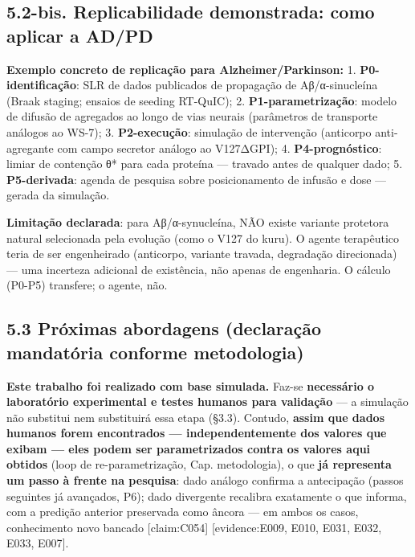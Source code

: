 \documentclass[
  12pt,
]{report}
\begin{document}
\hypertarget{bis.-replicabilidade-demonstrada-como-aplicar-a-adpd}{%
\subsection{5.2-bis. Replicabilidade demonstrada: como aplicar a
AD/PD}\label{bis.-replicabilidade-demonstrada-como-aplicar-a-adpd}}

\textbf{Exemplo concreto de replicação para Alzheimer/Parkinson:} 1.
\textbf{P0-identificação}: SLR de dados publicados de propagação de
Aβ/α-sinucleína (Braak staging; ensaios de seeding RT-QuIC); 2.
\textbf{P1-parametrização}: modelo de difusão de agregados ao longo de
vias neurais (parâmetros de transporte análogos ao WS-7); 3.
\textbf{P2-execução}: simulação de intervenção (anticorpo anti-agregante
com campo secretor análogo ao V127ΔGPI); 4. \textbf{P4-prognóstico}:
limiar de contenção θ* para cada proteína --- travado antes de qualquer
dado; 5. \textbf{P5-derivada}: agenda de pesquisa sobre posicionamento
de infusão e dose --- gerada da simulação.

\textbf{Limitação declarada}: para Aβ/α-synucleína, NÃO existe variante
protetora natural selecionada pela evolução (como o V127 do kuru). O
agente terapêutico teria de ser engenheirado (anticorpo, variante
travada, degradação direcionada) --- uma incerteza adicional de
existência, não apenas de engenharia. O cálculo (P0-P5) transfere; o
agente, não.

\hypertarget{pruxf3ximas-abordagens-declarauxe7uxe3o-mandatuxf3ria-conforme-metodologia}{%
\subsection{5.3 Próximas abordagens (declaração mandatória conforme
metodologia)}\label{pruxf3ximas-abordagens-declarauxe7uxe3o-mandatuxf3ria-conforme-metodologia}}

\textbf{Este trabalho foi realizado com base simulada.} Faz-se
\textbf{necessário o laboratório experimental e testes humanos para
validação} --- a simulação não substitui nem substituirá essa etapa
(§3.3). Contudo, \textbf{assim que dados humanos forem encontrados ---
independentemente dos valores que exibam --- eles podem ser
parametrizados contra os valores aqui obtidos} (loop de
re-parametrização, Cap. metodologia), o que \textbf{já representa um
passo à frente na pesquisa}: dado análogo confirma a antecipação (passos
seguintes já avançados, P6); dado divergente recalibra exatamente o que
informa, com a predição anterior preservada como âncora --- em ambos os
casos, conhecimento novo bancado {[}claim:C054{]} {[}evidence:E009,
E010, E031, E032, E033, E007{]}.
\end{document}
